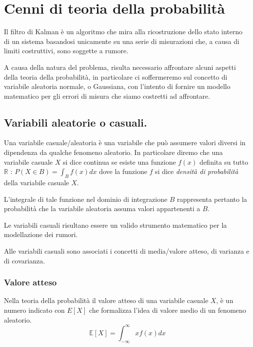 \section{Cenni di teoria della probabilità}

Il filtro di Kalman è un algoritmo che mira alla ricostruzione dello stato interno di un sistema basandosi unicamente su una serie di misurazioni che, a causa di limiti costruttivi, sono soggette a rumore.

A causa della natura del problema, risulta necessario affrontare alcuni aspetti della teoria della probabilità, in particolare ci soffermeremo sul concetto di variabile aleatoria normale, o Gaussiana, con l'intento di fornire un modello matematico per gli errori di misura che siamo costretti ad affrontare.

\subsection{Variabili aleatorie o casuali.}

Una variabile casuale/aleatoria è una variabile che può assumere valori diversi in dipendenza da qualche fenomeno aleatorio.
In particolare diremo che una variabile casuale $X$ si dice continua se esiste una funzione $f(x)$ definita su tutto $\mathbb{R}$ : $P(X \in B) = \int_B f(x) dx$ dove la funzione $f$ si dice \textit{densità di probabilità} della variabile casuale $X$.

L'integrale di tale funzione nel dominio di integrazione $B$ rappresenta pertanto la probabilità che la variabile aleatoria assuma valori appartenenti a $B$.

Le variabili casuali risultano essere un valido strumento matematico per la modellazione dei rumori.

Alle variabili casuali sono associati i concetti di media/valore atteso, di varianza e di covarianza.

\subsubsection{Valore atteso}

Nella teoria della probabilità il valore atteso di una variabile casuale $X$, è un numero indicato con $E[X]$ che formalizza l'idea di valore medio di un fenomeno aleatorio.
\begin{equation}
\ {\mathbb  {E}}[X]=\int _{{-\infty }}^{{\infty }}xf(x)dx
\end{equation}

